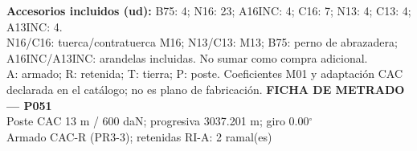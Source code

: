 \begingroup\scriptsize
\textbf{Accesorios incluidos (ud):} B75: 4; N16: 23; A16INC: 4; C16: 7; N13: 4; C13: 4; A13INC: 4.\\
N16/C16: tuerca/contratuerca M16; N13/C13: M13; B75: perno de abrazadera; A16INC/A13INC: arandelas incluidas. No sumar como compra adicional.\\
A: armado; R: retenida; T: tierra; P: poste. Coeficientes M01 y adaptación CAC declarada en el catálogo; no es plano de fabricación.
\endgroup\endgroup
\clearpage{}
\begingroup\small\setlength{\parskip}{3pt}\renewcommand{\arraystretch}{1.05}
\textbf{\large FICHA DE METRADO — P051}\\[4pt]
Poste CAC 13 m / 600 daN; progresiva 3037.201 m; giro 0.00\ensuremath{^\circ}\\
Armado CAC-R (PR3-3); retenidas RI-A: 2 ramal(es)\\
\begingroup\scriptsize

